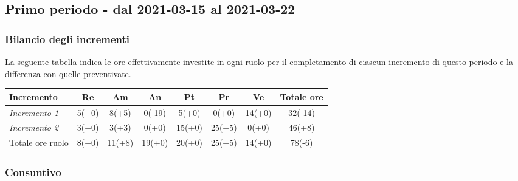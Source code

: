 {{{{{{\subsection{Primo periodo - dal 2021-03-15 al 2021-03-22}\label{ConsuntivoPrimoPeriodoDiProgettazioneDiDettaglioCodifica}

\subsubsection{Bilancio degli incrementi}\label{ConsuntivoPrimoPeriodoDiProgettazioneDiDettaglioCodificaIncrementi}

La seguente tabella indica le ore effettivamente investite in ogni ruolo per il completamento di ciascun incremento di questo periodo e la differenza con quelle preventivate.

\quad
\def\tabularxcolumn#1{m{#1}}
{

	\begin{center}
		\renewcommand{\arraystretch}{1.4}
		\begin{tabularx}{\textwidth}{|X|c|c|c|c|c|c|c|}
			\hline
			\rowcolor{airforceblue}
			\textbf{Incremento} & \textbf{Re} & \textbf{Am} & \textbf{An} & \textbf{Pt} & \textbf{Pr} & \textbf{Ve} & \textbf{Totale ore}\\
			\hline
			\textit{Incremento 1} & 5(+0) & 8(+5) & 0(-19) & 5(+0) & 0(+0) & 14(+0) & 32(-14) \\
			\hline
			\textit{Incremento 2} & 3(+0) & 3(+3) & 0(+0) & 15(+0) & 25(+5) & 0(+0) & 46(+8)\\
			\hline
			Totale ore ruolo & 8(+0) & 11(+8) & 19(+0) & 20(+0) & 25(+5) & 14(+0) & 78(-6)\\
			\hline
		\end{tabularx}
	\end{center}

\subsubsection{Consuntivo}\label{ConsuntivoPrimoPeriodoDiProgettazioneDiDettaglioCodificaIncrementiCosto}

}}}}}}}
